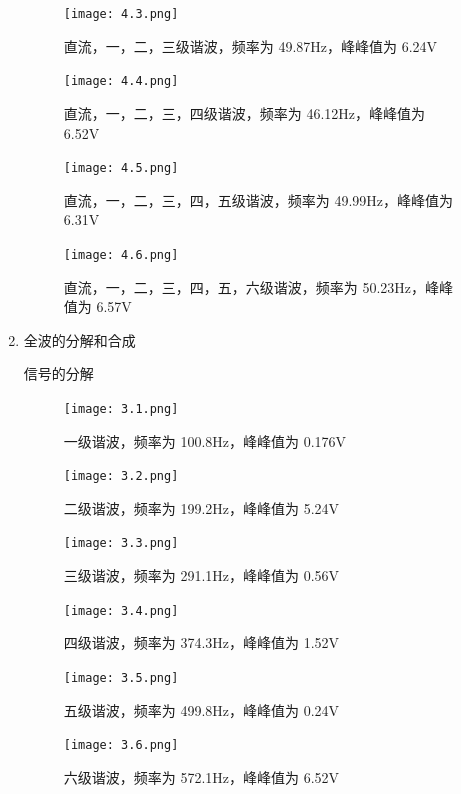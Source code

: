 \documentclass[dvipsnames, svgnames,a4paper,11pt]{article}
\begin{document}
\begin{enumerate}
\begin{figure}[htbp]
      \begin{minipage}[t]{0.48\textwidth}
      \centering
      \texttt{[image: 4.3.png]}
      \caption{直流，一，二，三级谐波，频率为 49.87Hz，峰峰值为 6.24V}
      \end{minipage}
      \centering
      \begin{minipage}[t]{0.48\textwidth}
      \centering
      \texttt{[image: 4.4.png]}
      \caption{直流，一，二，三，四级谐波，频率为 46.12Hz，峰峰值为 6.52V}
      \end{minipage}

      \begin{minipage}[t]{0.48\textwidth}
      \centering
      \texttt{[image: 4.5.png]}
      \caption{直流，一，二，三，四，五级谐波，频率为 49.99Hz，峰峰值为 6.31V}
      \end{minipage}
      \begin{minipage}[t]{0.48\textwidth}
      \centering
      \texttt{[image: 4.6.png]}
      \caption{直流，一，二，三，四，五，六级谐波，频率为 50.23Hz，峰峰值为 6.57V}
      \end{minipage}
    \end{figure}

  \newpage

  \item 全波的分解和合成
  
    信号的分解
    \begin{figure}[htbp]
      \centering
      \begin{minipage}[t]{0.48\textwidth}
      \centering
      \texttt{[image: 3.1.png]}
      \caption{一级谐波，频率为 100.8Hz，峰峰值为 0.176V}
      \end{minipage}
      \begin{minipage}[t]{0.48\textwidth}
      \centering
      \texttt{[image: 3.2.png]}
      \caption{二级谐波，频率为 199.2Hz，峰峰值为 5.24V}
      \end{minipage}

      \begin{minipage}[t]{0.48\textwidth}
      \centering
      \texttt{[image: 3.3.png]}
      \caption{三级谐波，频率为 291.1Hz，峰峰值为 0.56V}
      \end{minipage}
      \centering
      \begin{minipage}[t]{0.48\textwidth}
      \centering
      \texttt{[image: 3.4.png]}
      \caption{四级谐波，频率为 374.3Hz，峰峰值为 1.52V}
      \end{minipage}

      \begin{minipage}[t]{0.48\textwidth}
      \centering
      \texttt{[image: 3.5.png]}
      \caption{五级谐波，频率为 499.8Hz，峰峰值为 0.24V}
      \end{minipage}
      \begin{minipage}[t]{0.48\textwidth}
      \centering
      \texttt{[image: 3.6.png]}
      \caption{六级谐波，频率为 572.1Hz，峰峰值为 6.52V}
      \end{minipage}


\end{figure}
\end{enumerate}
\end{document}
